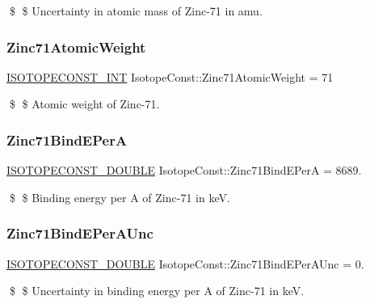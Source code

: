 \$ \$ Uncertainty in atomic mass of Zinc-\/71 in amu. \mbox{\label{group___isotope_const-_zinc-_zn71_ga7dfb33daeedcc5d17bab3b6b0942488a}} 
\subsubsection{\texorpdfstring{Zinc71\+Atomic\+Weight}{Zinc71AtomicWeight}}
{\footnotesize\ttfamily \mbox{\hyperlink{group___isotope_const-_macros_ga5f18360b3e99483a35c32d789e62621c}{I\+S\+O\+T\+O\+P\+E\+C\+O\+N\+S\+T\+\_\+\+I\+NT}} Isotope\+Const\+::\+Zinc71\+Atomic\+Weight = 71}

\$ \$ Atomic weight of Zinc-\/71. \mbox{\label{group___isotope_const-_zinc-_zn71_ga159021c33236abf46f23fea87ada8b58}} 
\subsubsection{\texorpdfstring{Zinc71\+Bind\+E\+PerA}{Zinc71BindEPerA}}
{\footnotesize\ttfamily \mbox{\hyperlink{group___isotope_const-_macros_ga8f45a7272ce02c0b4c65c44636ed719a}{I\+S\+O\+T\+O\+P\+E\+C\+O\+N\+S\+T\+\_\+\+D\+O\+U\+B\+LE}} Isotope\+Const\+::\+Zinc71\+Bind\+E\+PerA = 8689.}

\$ \$ Binding energy per A of Zinc-\/71 in keV. \mbox{\label{group___isotope_const-_zinc-_zn71_ga310534fffff4c96a2f80b0304d8a1a55}} 
\subsubsection{\texorpdfstring{Zinc71\+Bind\+E\+Per\+A\+Unc}{Zinc71BindEPerAUnc}}
{\footnotesize\ttfamily \mbox{\hyperlink{group___isotope_const-_macros_ga8f45a7272ce02c0b4c65c44636ed719a}{I\+S\+O\+T\+O\+P\+E\+C\+O\+N\+S\+T\+\_\+\+D\+O\+U\+B\+LE}} Isotope\+Const\+::\+Zinc71\+Bind\+E\+Per\+A\+Unc = 0.}

\$ \$ Uncertainty in binding energy per A of Zinc-\/71 in keV. \mbox{\label{group___isotope_const-_zinc-_zn71_ga83ffb11b546a2e7db729b10a280f9015}} 
